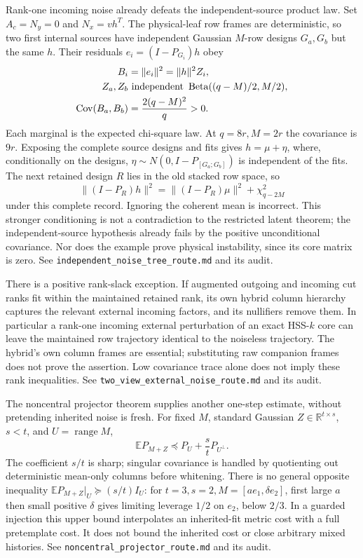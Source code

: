 \documentclass[11pt,oneside,openany,a4paper]{book}
\numberwithin{equation}{chapter}
\theoremstyle{definition}
\theoremstyle{remark}
\newcommand{\sourcefile}[1]{{\small\nolinkurl{#1}}}
\begin{document}
Rank-one incoming noise already defeats the independent-source product
law.  Set $A_c=N_y=0$ and $N_x=vh^T$.  The physical-leaf row frames
are deterministic, so two first internal sources have independent
Gaussian $M$-row designs $G_a,G_b$ but the same $h$.  Their residuals
$e_i=(I-P_{G_i})h$ obey
\[
 \begin{aligned}
 B_i&=\|e_i\|^2=\|h\|^2Z_i,\\
 Z_a,Z_b&\ \hbox{independent }
     \operatorname{Beta}((q-M)/2,M/2),\\
 \operatorname{Cov}(B_a,B_b)&=\frac{2(q-M)^2}{q}>0.
 \end{aligned}
\]
Each marginal is the expected chi-square law.  At $q=8r,M=2r$ the
covariance is $9r$.  Exposing the complete source designs and fits gives
$h=\mu+\eta$, where, conditionally on the designs,
$\eta\sim N(0,I-P_{[G_a;G_b]})$ is independent of the fits.  The next
retained design $R$ lies in the old stacked row space, so
\[
 \|(I-P_R)h\|^2
 =\|(I-P_R)\mu\|^2+\chi^2_{q-2M}
\]
under this complete record.  Ignoring the coherent mean is incorrect.
This stronger conditioning is not a contradiction to the restricted
latent theorem; the independent-source hypothesis already fails by the
positive unconditional covariance.  Nor does the example prove physical
instability, since its core matrix is zero.
See \sourcefile{independent_noise_tree_route.md} and its audit.

There is a positive rank-slack exception.  If augmented outgoing and
incoming cut ranks fit within the maintained retained rank, its own
hybrid column hierarchy captures the relevant external incoming factors,
and its nullifiers remove them.  In particular a rank-one incoming
external perturbation of an exact HSS-$k$ core can leave the maintained
row trajectory identical to the noiseless trajectory.  The hybrid's
own column frames are essential; substituting raw companion frames
does not prove the assertion.  Low covariance trace alone does not
imply these rank inequalities.  See
\sourcefile{two_view_external_noise_route.md} and its audit.

The noncentral projector theorem supplies another one-step estimate,
without pretending inherited noise is fresh.  For fixed $M$, standard
Gaussian $Z\in\mathbb R^{t\times s}$, $s<t$, and $U=\operatorname{range}M$,
\[
 \mathbb E P_{M+Z}\preceq P_U+\frac st P_{U^\perp}.
\]
The coefficient $s/t$ is sharp; singular covariance is handled by
quotienting out deterministic mean-only columns before whitening.
There is no general opposite inequality
$\mathbb E P_{M+Z}|_U\succeq(s/t)I_U$: for
$t=3,s=2,M=[a e_1,\delta e_2]$, first large $a$ then small positive
$\delta$ gives limiting leverage $1/2$ on $e_2$, below $2/3$.
In a guarded injection this upper bound interpolates an inherited-fit
metric cost with a full pretemplate cost.  It does not bound the
inherited cost or close arbitrary mixed histories.
See \sourcefile{noncentral_projector_route.md} and its audit.
\end{document}
